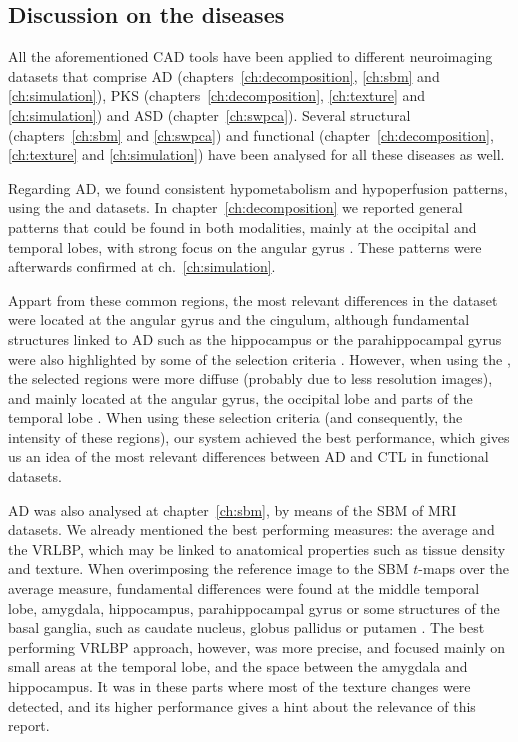 \subsection{Discussion on the diseases}
All the aforementioned \ac{CAD} tools have been applied to different neuroimaging datasets that comprise \ac{AD} (chapters~\ref{ch:decomposition}, \ref{ch:sbm} and \ref{ch:simulation}), \ac{PKS} (chapters~\ref{ch:decomposition}, \ref{ch:texture} and \ref{ch:simulation}) and \ac{ASD} (chapter~\ref{ch:swpca}). Several structural (chapters~\ref{ch:sbm} and \ref{ch:swpca}) and functional (chapter~\ref{ch:decomposition}, \ref{ch:texture} and \ref{ch:simulation}) have been analysed for all these diseases as well. 

Regarding \ac{AD}, we found consistent hypometabolism and hypoperfusion patterns, using the \adnipet{} and \vdlnhmpao{} datasets. In chapter~\ref{ch:decomposition} we reported general patterns that could be found in both modalities, mainly at the occipital and temporal lobes, with strong focus on the angular gyrus \cite{Dubois2007,Claus1994}. These patterns were afterwards confirmed at ch.~\ref{ch:simulation}. 

Appart from these common regions, the most relevant differences in the \adnipet{} dataset were located at the angular gyrus and the cingulum, although fundamental structures linked to \ac{AD} such as the hippocampus or the parahippocampal gyrus were also highlighted by some of the selection criteria \cite{Stoeckel04,Illan2011}. However, when using the \vdlnhmpao{}, the selected regions were more diffuse (probably due to less resolution images), and mainly located at the angular gyrus, the occipital lobe and parts of the temporal lobe \cite{Dubois2007,Claus1994}. When using these selection criteria (and consequently, the intensity of these regions), our system achieved the best performance, which gives us an idea of the most relevant differences between \ac{AD} and \ac{CTL} in functional datasets. 

\ac{AD} was also analysed at chapter~\ref{ch:sbm}, by means of the \ac{SBM} of \ac{MRI} datasets. We already mentioned the best performing measures: the average and the \ac{VRLBP}, which may be linked to anatomical properties such as tissue density and texture. When overimposing the reference image to the \ac{SBM} $t$-maps over the average measure, fundamental differences were found at the middle temporal lobe, amygdala, hippocampus, parahippocampal gyrus or some structures of the basal ganglia, such as caudate nucleus, globus pallidus or putamen \cite{Dubois2007,Pievani2013}. The best performing \ac{VRLBP} approach, however, was more precise, and focused mainly on small areas at the temporal lobe, and the space between the amygdala and hippocampus. It was in these parts where most of the texture changes were detected, and its higher performance gives a hint about the relevance of this report. 



